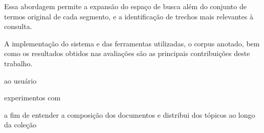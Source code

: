 

Essa abordagem permite a expansão do espaço de busca além do conjunto de termos original de cada segmento, e a identificação de trechos mais relevantes à consulta.


























A implementação do sistema e das ferramentas utilizadas, o corpus anotado, bem como os resultados obtidos nas avaliações são as principais contribuições deste trabalho. 



ao usuário 

















































experimentos com 

a fim de entender a composição dos documentos e distribui dos tópicos ao longo da coleção 

